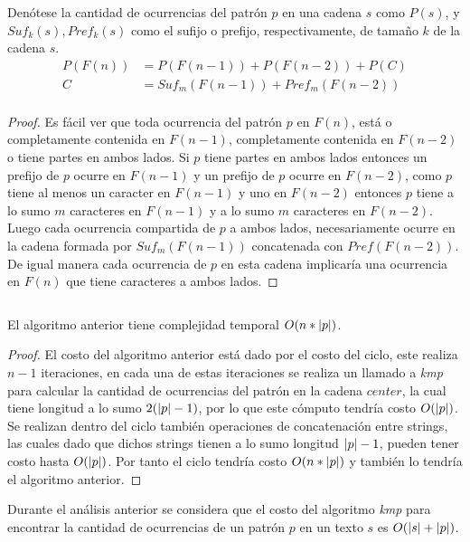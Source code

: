 \documentclass{article}
\begin{document}
\begin{theorem}
	Denótese la cantidad de ocurrencias del patrón $p$ en una 
	cadena $s$ como $P(s)$, y $Suf_k(s), Pref_k(s)$ como el sufijo 
	o prefijo, respectivamente, de tamaño $k$ de la cadena $s$.
	\begin{align*}
		P(F(n)) & = P(F(n-1)) + P(F(n-2)) + P(C)       \\
		C       & = {Suf}_m(F(n-1)) + {Pref}_m(F(n-2)) \\
	\end{align*}
\end{theorem}

\begin{proof}
	Es fácil ver que toda ocurrencia del patrón $p$ en $F(n)$, está 
	o completamente contenida en $F(n-1)$, completamente contenida 
	en $F(n-2)$ o tiene partes en ambos lados. Si $p$ tiene partes 
	en ambos lados entonces un prefijo de $p$ ocurre en $F(n-1)$ y 
	un prefijo de $p$ ocurre en $F(n-2)$, como $p$ tiene al menos 
	un caracter en $F(n-1)$ y uno en $F(n-2)$ entonces $p$ tiene a 
	lo sumo $m$ caracteres en $F(n-1)$ y a lo sumo $m$ caracteres 
	en $F(n-2)$. Luego cada ocurrencia compartida de $p$ a ambos 
	lados, necesariamente ocurre en la cadena formada por
	$Suf_m(F(n-1))$ concatenada con $Pref(F(n-2))$. De igual manera 
	cada ocurrencia de $p$ en esta cadena implicaría una ocurrencia 
	en $F(n)$ que tiene caracteres a ambos lados.
			
\end{proof}

\inputminted[firstline=10, linenos=false]{python}{code.py}

\begin{theorem}
	El algoritmo anterior tiene complejidad temporal
	$O(n*\left \vert p \right \vert)$.
\end{theorem}

\begin{proof}
	El costo del algoritmo anterior está dado por el costo del 
	ciclo, este realiza $n-1$ iteraciones, en cada una de estas 
	iteraciones se realiza un llamado a \emph{kmp} para calcular la 
	cantidad de ocurrencias del patrón en la cadena $center$, la 
	cual tiene longitud a lo sumo $2(\left \vert p \right \vert-1)$, por lo que este 
	cómputo tendría costo $O(\left \vert p \right \vert)$. Se realizan dentro del 
	ciclo también operaciones de concatenación entre strings, las 
	cuales dado que dichos strings tienen a lo sumo longitud
	$\left \vert p \right \vert-1$, pueden tener costo hasta $O(\left \vert p \right \vert)$. Por tanto 
	el ciclo tendría costo $O(n*\left \vert p \right \vert)$ y también lo tendría el 
	algoritmo anterior.
			
\end{proof}

\begin{note}
	Durante el análisis anterior se considera que el costo del algoritmo \emph{kmp} 
	para encontrar la cantidad de ocurrencias de un patrón $p$ en un texto $s$ es
	$O(\left \vert s \right \vert+\left \vert p \right \vert)$.
\end{note}
\end{document}

